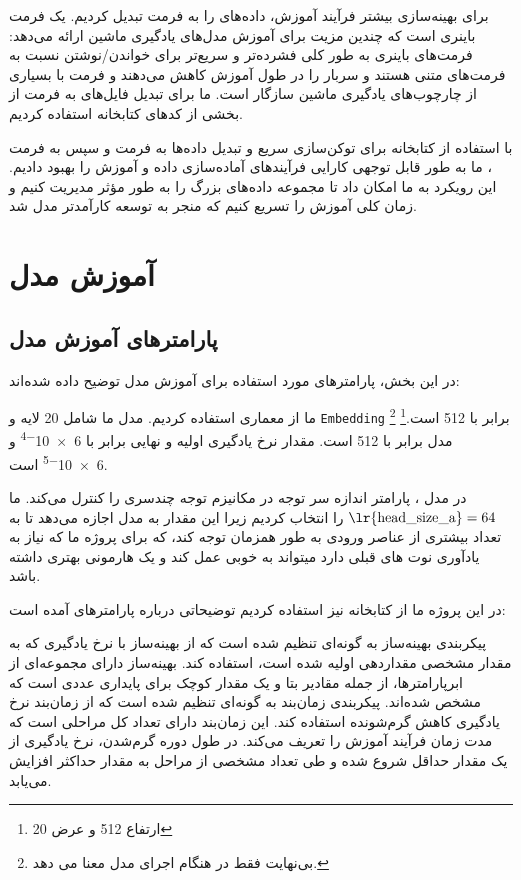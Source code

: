برای بهینه‌سازی بیشتر فرآیند آموزش، داده‌های  را به فرمت  تبدیل کردیم.  یک فرمت باینری است که چندین مزیت برای آموزش مدل‌های یادگیری ماشین ارائه می‌دهد: فرمت‌های باینری به طور کلی فشرده‌تر و سریع‌تر برای خواندن/نوشتن نسبت به فرمت‌های متنی هستند و سربار  را در طول آموزش کاهش می‌دهند و فرمت  با بسیاری از چارچوب‌های یادگیری ماشین سازگار است. ما برای تبدیل فایل‌های  به فرمت  از بخشی از کدهای کتابخانه  \cite{gpt-neox-library} استفاده کردیم.

با استفاده از کتابخانه  برای توکن‌سازی سریع و تبدیل داده‌ها به
فرمت  و سپس به فرمت ، ما به طور قابل توجهی کارایی فرآیندهای
آماده‌سازی داده و آموزش را بهبود دادیم. این رویکرد به ما امکان داد تا
مجموعه داده‌های بزرگ را به طور مؤثر مدیریت کنیم و زمان کلی آموزش را تسریع
کنیم که منجر به توسعه کارآمدتر مدل شد.

\section{آموزش مدل}
\subsection{پارامترهای آموزش مدل}
در این بخش، پارامترهای مورد استفاده برای آموزش مدل توضیح داده شده‌اند:

ما از معماری  \cite{peng2024eagle} استفاده کردیم. مدل ما شامل 20 لایه و
\texttt{Embedding} برابر با 512 است.\footnote{ارتفاع 512 و عرض 20}  \footnote{ بی‌نهایت فقط در هنگام اجرای مدل معنا می  دهد.} مدل برابر با
512 است.
مقدار نرخ یادگیری اولیه و نهایی برابر با \num{6e-4} و \num{6e-5} است.

در مدل ، پارامتر  اندازه سر توجه در مکانیزم توجه چندسری  را کنترل می‌کند. ما $\text{\lr{head\_size\_a}}=64$ را انتخاب کردیم زیرا این مقدار به مدل اجازه می‌دهد تا به تعداد بیشتری از عناصر ورودی به طور همزمان توجه کند، که برای پروژه ما که نیاز به یادآوری نوت های قبلی دارد میتواند به خوبی عمل کند و یک هارمونی بهتری داشته باشد.

در این پروژه ما از کتابخانه  نیز استفاده کردیم توضیحاتی درباره پارامترهای  آمده است:

پیکربندی بهینه‌ساز به گونه‌ای تنظیم شده است که از بهینه‌ساز  با نرخ یادگیری که به مقدار مشخصی مقداردهی اولیه شده است، استفاده کند. بهینه‌ساز  دارای مجموعه‌ای از ابرپارامترها، از جمله مقادیر بتا و یک مقدار کوچک برای پایداری عددی است که مشخص شده‌اند.
پیکربندی زمان‌بند به گونه‌ای تنظیم شده است که از زمان‌بند نرخ یادگیری کاهش گرم‌شونده استفاده کند. این زمان‌بند دارای تعداد کل مراحلی است که مدت زمان فرآیند آموزش را تعریف می‌کند. در طول دوره گرم‌شدن، نرخ یادگیری از یک مقدار حداقل شروع شده و طی تعداد مشخصی از مراحل به مقدار حداکثر افزایش می‌یابد.

